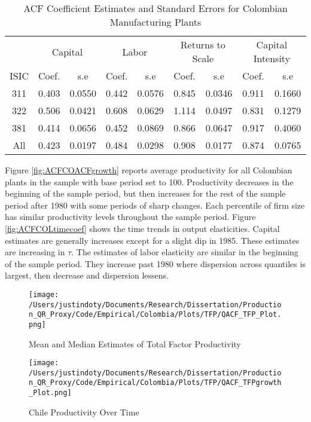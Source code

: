 \documentclass[11pt]{article}
\begin{document}
\begin{table}[H]
\centering
\caption{ACF Coefficient Estimates and Standard Errors for Colombian Manufacturing Plants}
\begin{tabular}{ccccccccc}
  \hline\hline & \multicolumn{2}{c}{Capital} & \multicolumn{2}{c}{Labor} & \multicolumn{2}{c}{Returns to Scale} & \multicolumn{2}{c}{Capital Intensity}\\ \cmidrule(lr){2-3} \cmidrule(lr){4-5} \cmidrule(lr){6-7} \cmidrule(lr){8-9}ISIC & Coef. & s.e & Coef. & s.e & Coef. & s.e & Coef. & s.e \\ 
  \hline
311 & 0.403 & 0.0550 & 0.442 & 0.0576 & 0.845 & 0.0346 & 0.911 & 0.1660 \\ 
  322 & 0.506 & 0.0421 & 0.608 & 0.0629 & 1.114 & 0.0497 & 0.831 & 0.1279 \\ 
  381 & 0.414 & 0.0656 & 0.452 & 0.0869 & 0.866 & 0.0647 & 0.917 & 0.4060 \\ 
  All & 0.423 & 0.0197 & 0.484 & 0.0298 & 0.908 & 0.0177 & 0.874 & 0.0765 \\ 
   \hline
\end{tabular}
\label{CHLACFCoef}
\end{table}

Figure \ref{fig:ACFCOACFgrowth} reports average productivity for all Colombian plants in the sample with base period set to 100. Productivity decreases in the beginning of the sample period, but then increases for the rest of the sample period after 1980 with some periods of sharp changes. Each percentile of firm size has similar productivity levels throughout the sample period. Figure \ref{fig:ACFCOLtimecoef} shows the time trends in output elasticities. Capital estimates are generally increases except for a slight dip in 1985. These estimates are increasing in $\tau$. The estimates of labor elasticity are similar in the beginning of the sample period. They increase past 1980 where dispersion across quantiles is largest, then decrease and dispersion lessens.

\begin{figure}[H]
\centering
\caption{Mean and Median Estimates of Total Factor Productivity}
\texttt{[image: /Users/justindoty/Documents/Research/Dissertation/Production\_QR\_Proxy/Code/Empirical/Colombia/Plots/TFP/QACF\_TFP\_Plot.png]}
\label{fig:ACFCOLTFPDens}
\end{figure}

\begin{figure}[H]
\centering
\caption{Chile Productivity Over Time}
\texttt{[image: /Users/justindoty/Documents/Research/Dissertation/Production\_QR\_Proxy/Code/Empirical/Colombia/Plots/TFP/QACF\_TFPgrowth\_Plot.png]}
\label{fig:ACFCOLpgrowth}
\end{figure}
\end{document}
